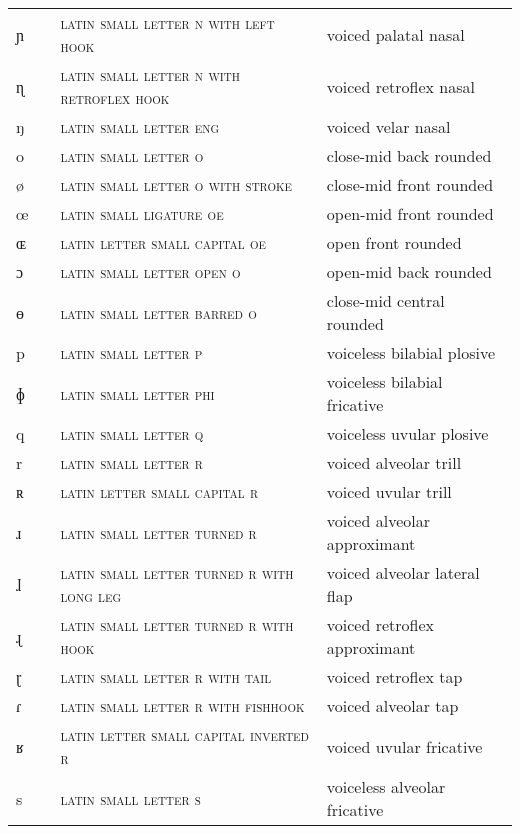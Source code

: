 \begin{center}
\begin{xtabular}{ l L{1.2cm} L{5.4cm} L{4.2cm} }
ɲ &  & \textsc{latin small letter n with left hook} & voiced palatal nasal \\ 
ɳ &  & \textsc{latin small letter n with retroflex hook} & voiced retroflex nasal \\ 
ŋ &  & \textsc{latin small letter eng} & voiced velar nasal \\ 
o &  & \textsc{latin small letter o} & close-mid back rounded \\ 
ø &  & \textsc{latin small letter o with stroke} & close-mid front rounded \\ 
œ &  & \textsc{latin small ligature oe} & open-mid front rounded \\ 
ɶ &  & \textsc{latin letter small capital oe} & open front rounded \\ 
ɔ &  & \textsc{latin small letter open o} & open-mid back rounded \\ 
ɵ &  & \textsc{latin small letter barred o} & close-mid central rounded \\ 
p &  & \textsc{latin small letter p} & voiceless bilabial plosive \\ 
ɸ &  & \textsc{latin small letter phi} & voiceless bilabial fricative \\ 
q &  & \textsc{latin small letter q} & voiceless uvular plosive \\ 
r &  & \textsc{latin small letter r} & voiced alveolar trill \\ 
ʀ &  & \textsc{latin letter small capital r} & voiced uvular trill \\ 
ɹ &  & \textsc{latin small letter turned r} & voiced alveolar approximant \\ 
ɺ &  & \textsc{latin small letter turned r with long leg} & voiced alveolar lateral flap \\ 
ɻ &  & \textsc{latin small letter turned r with hook} & voiced retroflex approximant \\ 
ɽ &  & \textsc{latin small letter r with tail} & voiced retroflex tap \\ 
ɾ &  & \textsc{latin small letter r with fishhook} & voiced alveolar tap \\ 
ʁ &  & \textsc{latin letter small capital inverted r} & voiced uvular fricative \\ 
s &  & \textsc{latin small letter s} & voiceless alveolar fricative \\ 

\end{xtabular}
\end{center}
